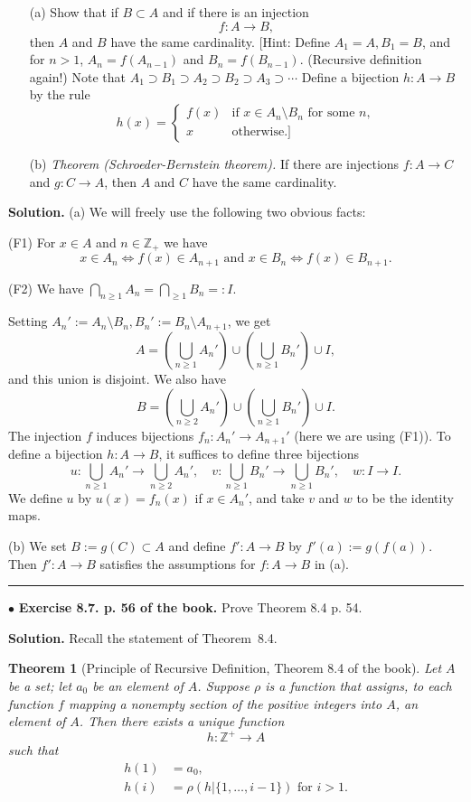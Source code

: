 \documentclass[12pt,letterpaper]{article}
\newtheorem{thm}{Theorem}%
\newcommand{\hs}{\bigskip\hrule\medskip}
\newcommand{\noi}{\noindent}%
\newcommand{\sm}{\setminus}
\newcommand{\Z}{\mathbb Z}
\begin{document}
\begin{enumerate}
    \item[(a)] Show that if $B \subset A$ and if there is an injection
    \[
    f: A \to B,
    \]
    then $A$ and $B$ have the same cardinality. [Hint: Define $A_1 = A, B_1 = B$, and for $n > 1$, $A_n = f(A_{n-1})$ and $B_n = f(B_{n-1})$. (Recursive definition again!) Note that $A_1 \supset B_1 \supset A_2 \supset B_2 \supset A_3 \supset \cdots$ Define a bijection $h: A \to B$ by the rule
    \[
    h(x) = \begin{cases} 
    f(x) & \text{if } x \in A_n\sm B_n \text{ for some } n, \\
    x & \text{otherwise}.]
    \end{cases}
    \]
    \item[(b)] \textit{Theorem (Schroeder-Bernstein theorem).} If there are injections $f: A \to C$ and $g: C \to A$, then $A$ and $C$ have the same cardinality.
\end{enumerate} 

\noi\textbf{Solution.} (a) We will freely use the following two obvious facts: 

(F1) For $x\in A$ and $n\in\Z_+$ we have 
$$
x\in A_n\iff f(x)\in A_{n+1}\text{ and }x\in B_n\iff f(x)\in B_{n+1}.
$$ 

(F2) We have $\bigcap_{n\ge1}A_n=\bigcap_{\ge1}B_n=:I$. 

\noi Setting $A_n':=A_n\sm B_n,B_n':=B_n\sm A_{n+1}$, we get 
$$
A=\left(\bigcup_{n\ge1}A_n'\right)\cup\left(\bigcup_{n\ge1}B_n'\right)\cup I,
$$ 
and this union is disjoint. We also have 
$$
B=\left(\bigcup_{n\ge2}A_n'\right)\cup\left(\bigcup_{n\ge1}B_n'\right)\cup I.
$$ 
The injection $f$ induces bijections $f_n:A_n'\to A_{n+1}'$ (here we are using (F1)). To define a bijection $h:A\to B$, it suffices to define three bijections 
$$
u:\bigcup_{n\ge1}A_n'\to\bigcup_{n\ge2}A_n',\quad v:\bigcup_{n\ge1}B_n'\to\bigcup_{n\ge1}B_n',\quad w:I\to I.
$$ 
We define $u$ by $u(x)=f_n(x)$ if $x\in A_n'$, and take $v$ and $w$ to be the identity maps. 

\noi(b) We set $B:=g(C)\subset A$ and define $f':A\to B$ by $f'(a):=g(f(a))$. Then $f':A\to B$ satisfies the assumptions for $f:A\to B$ in (a). 

\hs 

\noi$\bullet$ \textbf{Exercise 8.7. p. 56 of the book.} Prove Theorem 8.4 p. 54. 

\noi\textbf{Solution.} Recall the statement of Theorem~8.4. 

\begin{thm}[Principle of Recursive Definition, Theorem 8.4 of the book]\label{TPRD}
Let $A$ be a set; let $a_0$ be an element of $A$. Suppose $\rho$ is a function that assigns, to each function $f$ mapping a nonempty section of the positive integers into $A$, an element of $A$. Then there exists a unique function
\[h: \mathbb{Z}^+ \to A\]
such that
\[
\begin{aligned}
h(1) &= a_0,\\
h(i) &= \rho(h|{\{1,\ldots,i-1\}}) \text{ for } i > 1.
\end{aligned}
\tag{$*$}
\]
\end{thm}
\end{document}
